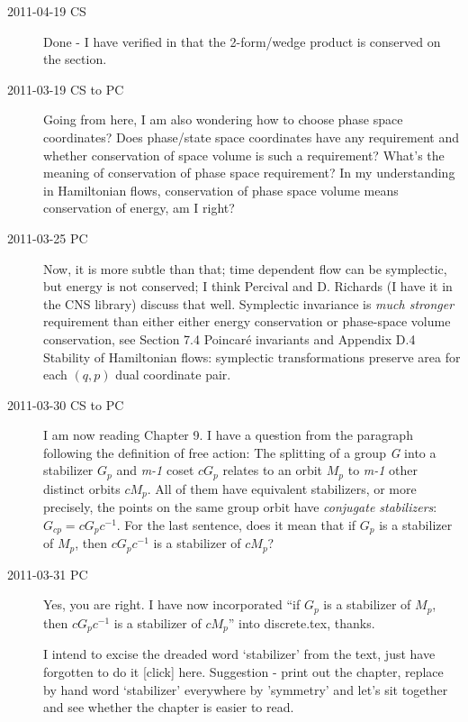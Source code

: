 \begin{description}
\item[2011-04-19 CS] Done - I have verified in  that
the 2-form/wedge product is conserved on the \Poincare section.


\item[2011-03-19 CS to PC]
Going from here, I am also
   wondering how to choose phase space coordinates? Does phase/state
   space coordinates have any requirement and whether conservation of
   space volume is such a requirement? What's the meaning of conservation
   of phase space requirement? In my understanding in Hamiltonian flows,
   conservation of phase space volume means conservation of energy, am I
   right?


\item[2011-03-25 PC]
Now, it is more subtle than that; time dependent flow can be symplectic,
but energy is not conserved; I think Percival and D.
Richards (I have it in the
 {CNS library})
discuss that well. Symplectic invariance is \emph{much stronger}
requirement than either either energy conservation or phase-space volume
conservation, see 
{Section 7.4 Poincar\'e invariants} and
 {Appendix D.4
Stability of Hamiltonian flows}: symplectic transformations preserve area
for each $(q,p)$ dual coordinate  pair.

\item[2011-03-30  CS to PC]
I am now reading Chapter 9. I have a question from the paragraph
following the definition of free action: The splitting of a group
\emph{G} into a stabilizer \emph{$G_{p}$} and \emph{m-1} coset
\emph{$cG_{p}$} relates to an orbit \emph{$M_{p}$} to \emph{m-1} other
distinct orbits \emph{$cM_{p}$}. All of them have equivalent stabilizers,
or more precisely, the points on the same group orbit have
\emph{conjugate stabilizers}: \emph{$G_{cp} = cG_{p}c^{-1}$}. For the
last sentence, does it mean that if \emph{$G_{p}$}  is a stabilizer of
\emph{$M_{p}$}, then \emph{$cG_{p}c^{-1}$} is a stabilizer of
\emph{$cM_{p}$}?

\item[2011-03-31 PC] Yes, you are right. I have now incorporated ``if
\emph{$G_{p}$}  is a stabilizer of \emph{$M_{p}$}, then
\emph{$cG_{p}c^{-1}$} is a stabilizer of \emph{$cM_{p}$}'' into
discrete.tex, thanks.

I intend to excise the dreaded word `stabilizer' from the text, just have
forgotten to do it
{[click]} here. Suggestion - print out the chapter, replace by hand word
`stabilizer' everywhere by 'symmetry' and let's sit together and see
whether the chapter is  easier to read.


\end{description}

